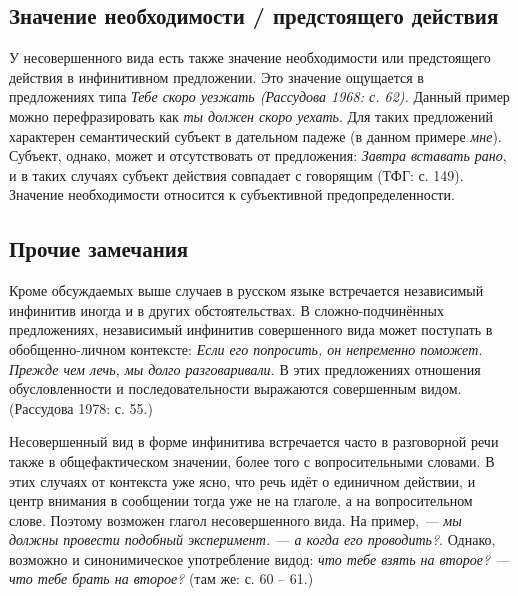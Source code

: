 \subsection{Значение необходимости / предстоящего действия}

У несовершенного вида есть также значение необходимости или предстоящего действия в инфинитивном предложении. Это значение ощущается в предложениях типа \textit{Тебе скоро уезжать (Рассудова 1968: с. 62).} Данный пример можно перефразировать как \textit{ты должен скоро уехать}. Для таких предложений характерен семантический субъект в дательном падеже (в данном примере \textit{мне}). Субъект, однако, может и отсутствовать от предложения: \textit{Завтра вставать рано}, и в таких случаях субъект действия совпадает с говорящим (ТФГ: с. 149). Значение необходимости относится к субъективной предопределенности.

\subsection{Прочие замечания}

Кроме обсуждаемых выше случаев в русском языке встречается независимый инфинитив иногда и в других обстоятельствах. В сложно-подчинённых предложениях, независимый инфинитив совершенного вида может поступать в обобщенно-личном контексте: \textit{Если его попросить, он непременно поможет. Прежде чем лечь, мы долго разговаривали.} В этих предложениях отношения обусловленности и последовательности выражаются совершенным видом. (Рассудова 1978: с. 55.)   

Несовершенный вид в форме инфинитива встречается часто в разговорной речи также в общефактическом значении, более того с вопросительными словами. В этих случаях от контекста уже ясно, что речь идёт о единичном действии, и центр внимания в сообщении тогда уже не на глаголе, а на вопросительном слове. Поэтому возможен глагол несовершенного вида. На пример, \textit{--- мы должны провести подобный эксперимент. --- а когда его проводить?}. Однако, возможно и синонимическое употребление видод: \textit{что тебе взять на второе? --- что тебе брать на второе?} (там же: с. 60 -- 61.)
